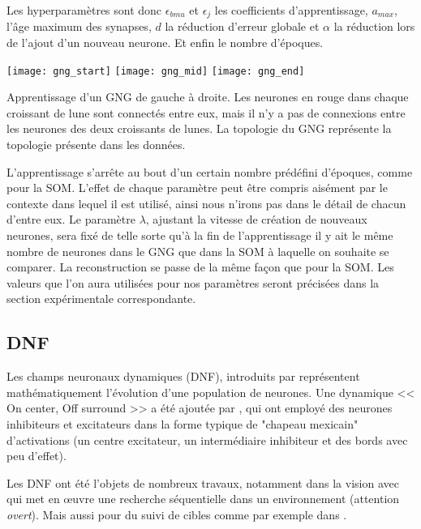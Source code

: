 	Les hyperparamètres sont donc $\epsilon_{\textit{bmu}}$ et $\epsilon_{j}$ les coefficients d'apprentissage, $a_{\textit{max}}$, l'âge maximum des synapses, $d$ la réduction d'erreur globale et $\alpha$ la réduction lors de l'ajout d'un nouveau neurone. Et enfin le nombre d'époques.

	\begin{figureth}
		\texttt{[image: gng\_start]}
		\texttt{[image: gng\_mid]}
		\texttt{[image: gng\_end]}
		\caption[Apprentissage de GNG]{Apprentissage d'un GNG de gauche à droite. Les neurones en rouge dans chaque croissant de lune sont connectés entre eux, mais il n'y a pas de connexions entre les neurones des deux croissants de lunes. La topologie du GNG représente la topologie présente dans les données.\footnotemark}\label{fig:gng}
	\end{figureth}

	L'apprentissage s'arrête au bout d'un certain nombre prédéfini d'époques, comme pour la SOM. L'effet de chaque paramètre peut être compris aisément par le contexte dans lequel il est utilisé, ainsi nous n'irons pas dans le détail de chacun d'entre eux. Le paramètre $\lambda$, ajustant la vitesse de création de nouveaux neurones, sera fixé de telle sorte qu'à la fin de l'apprentissage il y ait le même nombre de neurones dans le GNG que dans la SOM à laquelle on souhaite se comparer. La reconstruction se passe de la même façon que pour la SOM. Les valeurs que l'on aura utilisées pour nos paramètres seront précisées dans la section expérimentale correspondante.

	\subsection{DNF}\label{sec:sota:dnf}


	Les champs neuronaux dynamiques (DNF), introduits par \cite{amari1977dynamics} représentent mathématiquement l'évolution d'une population de neurones. Une dynamique << On center, Off surround >> a été ajoutée par \cite{ellias1975pattern}, qui ont employé des neurones inhibiteurs et excitateurs dans la forme typique de "chapeau mexicain" d'activations (un centre excitateur, un intermédiaire inhibiteur et des bords avec peu d'effet).
	
	Les DNF ont été l'objets de nombreux travaux, notamment dans la vision avec \cite{fix2011dynamic} qui met en œuvre une recherche séquentielle dans un environnement (attention \textit{overt}). Mais aussi pour du suivi de cibles comme par exemple dans \cite{martel2016neuromorphic}.

